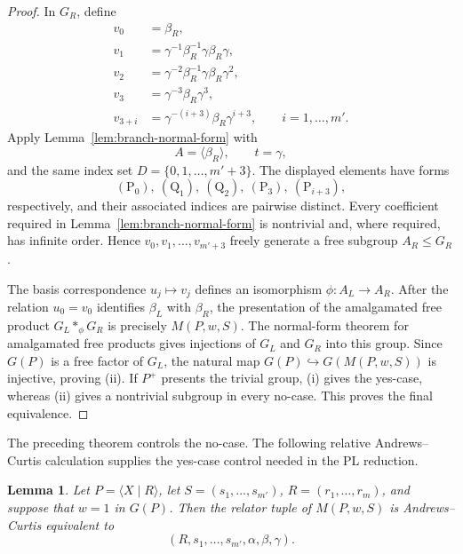 \documentclass[a4paper,11pt,reqno]{amsart}
\newtheorem{lemma}[theorem]{Lemma}
\theoremstyle{definition}
\theoremstyle{remark}
\begin{document}
\begin{proof}
		In $G_R$, define
		\[
		\begin{aligned}
			v_0&=\beta_R,\\
			v_1&=\gamma^{-1}\beta_R^{-1}\gamma\beta_R\gamma,\\
			v_2&=\gamma^{-2}\beta_R^{-1}\gamma\beta_R\gamma^2,\\
			v_3&=\gamma^{-3}\beta_R\gamma^3,\\
			v_{3+i}&=\gamma^{-(i+3)}\beta_R\gamma^{i+3},
			\qquad i=1,\ldots,m'.
		\end{aligned}
		\]
		Apply Lemma~\ref{lem:branch-normal-form} with
		\[
		A=\langle\beta_R\rangle,\qquad t=\gamma,
		\]
		and the same index set $D=\{0,1,\ldots,m'+3\}$. The displayed elements have forms
		\[
		(\mathrm{P}_0),\ (\mathrm{Q}_1),\ (\mathrm{Q}_2),\ (\mathrm{P}_3),\ (\mathrm{P}_{i+3}),
		\]
		respectively, and their associated indices are pairwise distinct. Every coefficient required in Lemma~\ref{lem:branch-normal-form} is nontrivial and, where required, has infinite order. Hence
		$
		v_0,v_1,\ldots,v_{m'+3}
		$
		freely generate a free subgroup $A_R\le G_R$.
		
		The basis correspondence $u_j\mapsto v_j$ defines an isomorphism
		\(
		\phi\colon A_L\longrightarrow A_R.
		\)
		After the relation $u_0=v_0$ identifies $\beta_L$ with $\beta_R$, the
		presentation of the amalgamated free product
		$
		G_L*_{\phi}G_R
		$
		is precisely $M(P,w,S)$. The normal-form theorem for amalgamated free
		products gives injections of $G_L$ and $G_R$ into this group. Since
		$G(P)$ is a free factor of $G_L$, the natural map
		$
		G(P)\hookrightarrow G(M(P,w,S))
		$
		is injective, proving (ii). If $P^+$ presents the trivial group, (i) gives the yes-case,
		whereas (ii) gives a nontrivial subgroup in every no-case. This proves the
		final equivalence.
	\end{proof}
	The preceding theorem controls the no-case. The following relative
	Andrews--Curtis calculation supplies the yes-case control needed in
	the PL reduction.
	
	\begin{lemma}
		\label{lem:relative-AC}
		Let $P=\langle X\mid R\rangle$, let $S=(s_1,\dots,s_{m'})$, $R=(r_1,\ldots,r_m)$, and suppose
		that $w=1$ in $G(P)$. Then the relator tuple
		of $M(P,w,S)$ is Andrews--Curtis equivalent to
		\[
		(R,s_1,\dots,s_{m'},\alpha,\beta,\gamma).
		\]
	\end{lemma}
	
\end{document}
